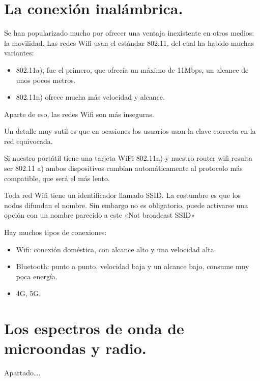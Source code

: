 \documentclass[letterpaper,10pt,spanish]{sphinxmanual}
\begin{document}
\section{La conexión inalámbrica.}
\label{\detokenize{t2_integracion_elementos/apuntes_t2:la-conexion-inalambrica}}
\sphinxAtStartPar
Se han popularizado mucho por ofrecer una ventaja inexistente en otros medios: la movilidad. Las redes Wifi usan el estándar 802.11, del cual ha habido muchas variantes:
\begin{itemize}
\item {} 
\sphinxAtStartPar
802.11a), fue el primero, que ofrecía un máximo de 11Mbps, un alcance de unos pocos metros.

\item {} 
\sphinxAtStartPar
802.11n) ofrece mucha más velocidad y alcance.

\end{itemize}

\sphinxAtStartPar
Aparte de eso, las redes Wifi son más inseguras.

\sphinxAtStartPar
Un detalle muy sutil es que en ocasiones los usuarios usan la clave correcta en la red equivocada.

\sphinxAtStartPar
Si nuestro portátil tiene una tarjeta WiFi 802.11n) y nuestro router wifi resulta ser 802.11 a) ambos dispositivos cambian automáticamente al protocolo más compatible, que será el más lento.

\sphinxAtStartPar
Toda red Wifi tiene un identificador llamado SSID. La costumbre es que los nodos difundan el nombre. Sin embargo no es obligatorio, puede activarse una opción con un nombre parecido a este «Not broadcast SSID»

\sphinxAtStartPar
Hay muchos tipos de conexiones:
\begin{itemize}
\item {} 
\sphinxAtStartPar
Wifi: conexión doméstica, con alcance alto y una velocidad alta.

\item {} 
\sphinxAtStartPar
Bluetooth:  punto a punto, velocidad baja y un alcance bajo, consume muy poca energía.

\item {} 
\sphinxAtStartPar
4G, 5G.

\end{itemize}


\section{Los espectros de onda de microondas y radio.}
\label{\detokenize{t2_integracion_elementos/apuntes_t2:los-espectros-de-onda-de-microondas-y-radio}}
\sphinxAtStartPar
Apartado….
\end{document}
